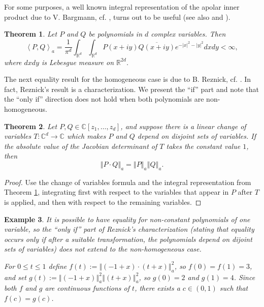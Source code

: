 \documentclass[12pt]{amsart}
\newtheorem{theorem}{Theorem}
\newtheorem{example}[theorem]{Example}
\newcommand{\C}{\mathbb{C}}
\begin{document}
For some purposes, a well known integral representation of the apolar inner product due to  V. Bargmann, cf. \cite{Bar}, turns out to be useful  (see also \cite{NeSh66} and \cite{Pina12}).

\begin{theorem} \label{barg}
Let $P$ and $Q$ be polynomials in $d$ complex variables. Then
\begin{equation}
\left\langle P,Q\right\rangle _{a}=\frac{1}{\pi^{d}}\int_{\mathbb{R}^{d}}
\int_{\mathbb{R}^{d}}P\left(  x+iy\right)  \overline{Q\left(  x+iy\right)
}e^{-\left|  x\right|  ^{2}-\left|  y\right|  ^{2}}dxdy<\infty\label{Bargman},
\end{equation}
where $dxdy$ is Lebesgue measure on $\mathbb{R}^{2d}$.
\end{theorem}


The next equality result for the homogeneous case is due to B. Reznick, cf. \cite[Main Theorem]{Rezn93}. In fact, Reznick's result is a characterization. We present the ``if'' part and note that the ``only if'' direction does not hold
when both polynomials are non-homogeneous.


\begin{theorem} \label{BombieriJensen} Let $P, Q  \in \mathbb{C}[z_{1},\dots,z_{d}]$, and suppose there is a linear change of variables 
	 $T: \C^d \to\C$ which makes $P$ and $Q$ depend on disjoint sets of variables. If the absolute value of the Jacobian determinant of $T$ takes the constant value $1$, then  
	\[
\left\Vert P \cdot Q \right\Vert _{a}
=
\left\Vert P \right\Vert _{a}  \left\Vert Q \right\Vert _{a}.
\]		
\end{theorem}

\begin{proof} Use the change of variables formula  and the integral representation from Theorem  \ref{barg}, integrating first with respect to the variables that appear in $P$ after $T$ is applied, and then with respect to the remaining variables.
\end{proof}


\begin{example} It is possible to have equality for non-constant polynomials of one variable, so the ``only if''  part of Reznick's characterization (stating that equality occurs only if after a suitable transformation, the polynomials depend on dijoint sets of variables) does not extend to the non-homogeneous case. 

For $0 \le t \le 1$ define $f(t):= \left\Vert (-1 + x)  \cdot (t + x) \right\Vert _{a}^2$, so $f(0) = f(1) = 3$, and set  $g(t):= \left\Vert (-1 + x)  \right\Vert _{a}^2 \left\Vert (t + x) \right\Vert _{a}^2$, so $g(0) = 2$ and  $ g(1) = 4$. Since both $f$ and $g$ are continuous functions of $t$, there exists a $c \in (0,1)$ such that $f(c) = g(c) $.\end{example}
\end{document}
